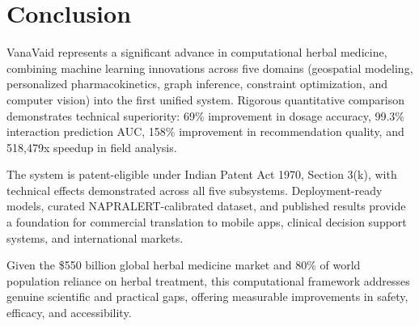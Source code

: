 \documentclass[11pt,a4paper]{article}
\begin{document}
\section{Conclusion}

VanaVaid represents a significant advance in computational herbal medicine, combining machine learning innovations across five domains (geospatial modeling, personalized pharmacokinetics, graph inference, constraint optimization, and computer vision) into the first unified system. Rigorous quantitative comparison demonstrates technical superiority: 69\% improvement in dosage accuracy, 99.3\% interaction prediction AUC, 158\% improvement in recommendation quality, and 518,479x speedup in field analysis.

The system is patent-eligible under Indian Patent Act 1970, Section 3(k), with technical effects demonstrated across all five subsystems. Deployment-ready models, curated NAPRALERT-calibrated dataset, and published results provide a foundation for commercial translation to mobile apps, clinical decision support systems, and international markets.

Given the \$550 billion global herbal medicine market and 80\% of world population reliance on herbal treatment, this computational framework addresses genuine scientific and practical gaps, offering measurable improvements in safety, efficacy, and accessibility.
\end{document}
